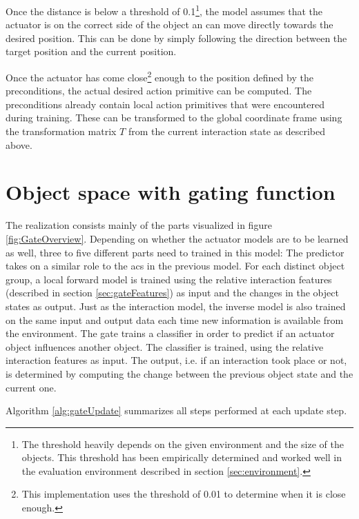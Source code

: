 Once the distance is below a threshold of 0.1\footnote{The threshold heavily depends on the given environment and the size of the objects. This threshold has been empirically determined and worked well in the evaluation environment described in section \ref{sec:environment}.}, the model assumes that the actuator is on the correct side of the object an can move directly towards the desired position. This can be done by simply following the direction between the target position and the current position.

Once the actuator has come close\footnote{This implementation uses the threshold of 0.01 to determine when it is close enough.} enough to the position defined by the preconditions, the actual desired action primitive can be computed. The preconditions already contain local action primitives that were encountered during training. These can be transformed to the global coordinate frame using the transformation matrix $T$ from the current interaction state as described above. 


\section{Object space with gating function \label{sec:gateRealization}}

The realization consists mainly of the parts visualized in figure \ref{fig:GateOverview}. 
Depending on whether the actuator models are to be learned as well, three to five different parts need to trained in this model: The predictor takes on a similar role to the \glspl{ac} in the previous model. For each distinct object group, a local forward model is trained using the relative interaction features (described in section \ref{sec:gateFeatures}) as input and the changes in the object states as output. Just as the interaction model, the inverse model is also trained on the same input and output data each time new information is available from the environment. 
The gate trains a classifier in order to predict if an actuator object influences another object. The classifier is trained, using the relative interaction features as input. The output, i.e. if an interaction took place or not, is determined by computing the change between the previous object state and the current one.

Algorithm \ref{alg:gateUpdate} summarizes all steps performed at each update step.

